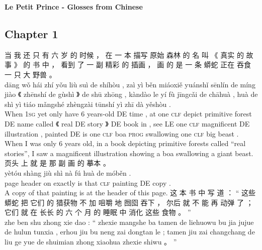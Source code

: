 \documentclass[UTF8]{ctexart}
\begin{document}
\begin{center}
\textbf{\Large{Le Petit Prince - Glosses from Chinese}}\\
\end{center}

\subsection*{Chapter 1}

\begin{exe}
\ex 
\glll
当 我 还 只 有 六 岁 的 时候 ， 在 一 本 描写 原始 森林 的 名 叫 《 真实 的 故事 》 的 书 中 ， 看到 了 一 副 精彩 的 插画 ， 画 的 是 一 条 蟒蛇 正在 吞食 一 只 大 野兽 。
\\
d\={a}ng w\v{o} h\'{a}i zh\'{i} y\v{o}u li\`{u} su\`{i} de sh\'{i}h\`{o}u , za\`{i} y\`{i} b\v{e}n mi\'{a}oxi\v{e} yu\'{a}nsh\v{i} s\={e}nl\'{i}n de m\'{i}ng ji\`{a}o 《 zh\={e}nsh\'{i} de g\`{u}sh\`{i} 》 de sh\={u} zh\={o}ng , k\`{a}nd\`{a}o le y\'{i} f\`{u} j\={i}ngc\v{a}i de ch\={a}hu\`{a} , hu\`{a} de sh\`{i} y\`{i} ti\'{a}o m\v{a}ngsh\'{e} zh\`{e}ngz\`{a}i t\={u}nsh\'{i} y\`{i} zh\={i} d\`{a} y\v{e}sh\`{o}u .
\\
When \textsc{1sg} yet only have 6 years-old DE time , at one \textsc{clf} depict primitive forest DE name called 《 real DE story 》 DE book in , see LE one \textsc{clf} magnificent DE illustration , painted DE is one \textsc{clf} boa \textsc{prog} swallowing one \textsc{clf} big beast . 
\\
\trans When I was only 6 years old, in a book depicting primitive forests called ``real stories'', I saw a magnificent illustration showing a boa swallowing a giant beast. 
\ex
\glll
页头 上 就 是 那 副 画 的 摹本 。 
\\
y\`{e}t\'{o}u sh\`{a}ng ji\`{u} sh\`{i} n\`{a} f\'{u} hu\`{a} de m\'{o}b\v{e}n .
\\
{page header} on exactly is that \textsc{clf} painting DE copy .
\\
\trans A copy of that painting is at the header of this page. 
\ex
\glll
这 本 书 中 写 道 ： `` 这些 蟒蛇 把 它们 的 猎获物 不 加 咀嚼 地 囫囵 吞下 ， 尔后 就 不 能 再 动弹 了 ； 它们 就 在 长长 的 六 个 月 的 睡眠 中 消化 这些 食物 。 '' 
\\
zhe ben shu zhong xie dao : `` zhexie mangshe ba tamen de liehuowu bu jia jujue de hulun tunxia , erhou jiu bu neng zai dongtan le ; tamen jiu zai changchang de liu ge yue de shuimian zhong xiaohua zhexie shiwu 。 ''

\end{exe}
\end{document}
